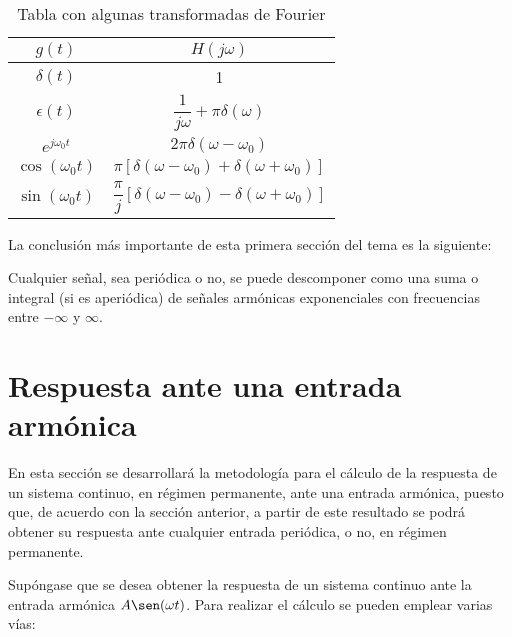 \begin{table}[htb]
	\bigskip
	\begin{center}
		\caption{Tabla con algunas transformadas de Fourier}\label{tabla}
		\begin{tabular}{c c}
			\toprule
			$g(t)$ & $H(j\omega )$ \\[1ex] \midrule 
			$\delta(t)$ & 1 \\[1ex] 
			$\epsilon(t)$ & $\dfrac{1}{j\omega}+\pi\delta(\omega)$ \\[3ex]
			$e^{j\omega_0t}$ & $2\pi\delta(\omega-\omega_0)$ \\[2ex] 
			$\cos(\omega_0t)$ & $\pi\left[\delta(\omega-\omega_0) + 
				\delta(\omega+\omega_0)\right]$ \\[2ex] 
			$\sin(\omega_0t)$ & $\dfrac{\pi}{j}\left[\delta(\omega-\omega_0) - 
				\delta(\omega+\omega_0)\right]$ \\[2ex]
			\bottomrule
		\end{tabular}
	\end{center}
\end{table}


La conclusión más importante de esta primera sección del tema es la siguiente:

\begin{parrafoDestacado}

Cualquier señal, sea periódica o no, se puede descomponer
como una suma o integral (si es aperiódica) de señales armónicas exponenciales con frecuencias entre
$-\infty$ y $\infty$.

\end{parrafoDestacado}

\section{Respuesta ante una entrada armónica}
\label{sec:frec:RespArmonicas}

En esta sección se desarrollará la metodología para el cálculo de la respuesta de un sistema
continuo, en régimen permanente, ante una entrada armónica, puesto que, de acuerdo con la sección
anterior, a partir de este resultado se podrá obtener su respuesta ante cualquier entrada periódica,
o no, en régimen permanente.


Supóngase que se desea obtener la respuesta de un sistema continuo ante la entrada armónica
$A\sen (\omega t)$.  Para realizar el cálculo se pueden emplear varias vías:

